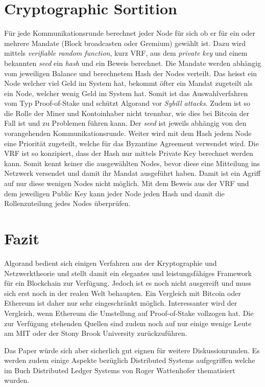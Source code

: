 \documentclass[11pt,a4paper]{article}
\begin{document}
\section*{Cryptographic Sortition}
F\"ur jede Kommunikationsrunde berechnet jeder Node f\"ur sich ob er f\"ur ein oder mehrere Mandate (Block broadcasten oder Gremium) gew\"ahlt ist.
Dazu wird mittels \textit{verifiable random function}, kurz VRF, aus dem \textit{private key} und einem bekannten \textit{seed} ein \textit{hash} und ein Beweis berechnet. %
Die Mandate werden abh\"angig vom jeweiligen Balance und berechnetem Hash der Nodes verteilt.
Das heisst ein Node welcher viel Geld im System hat, bekommt \"ofter ein Mandat zugeteilt als ein Node, welcher wenig Geld im System hat.
Somit ist das Auswahlverfahren vom Typ Proof-of-Stake und sch\"utzt Algorand vor \textit{Sybill attacks}.
Zudem ist so die Rolle der Miner und Kontoinhaber nicht trennbar, wie dies bei Bitcoin der Fall ist und zu Problemen f\"uhren kann.
Der \textit{seed} ist jeweils abh\"angig von den vorangehenden Kommunikationsrunde.
Weiter wird mit dem Hash jedem Node eine Priorit\"at zugeteilt, welche f\"ur das Byzantine Agreement verwendet wird.
Die VRF ist so konzipiert, dass der Hash nur mittels Private Key berechnet werden kann.
Somit kennt keiner die ausgew\"ahlten Nodes, bevor diese eine Mitteilung ins Netzwerk versendet und
damit ihr Mandat ausgef\"uhrt haben.
Damit ist ein Agriff auf nur diese wenigen Nodes nicht m\"oglich.
Mit dem Beweis aus der VRF und dem jeweiligen Public Key kann jeder Node jeden Hash und damit die Rollenzuteilung jedes Nodes \"uberpr\"ufen.

\section*{Fazit}
Algorand bedient sich einigen Verfahren aus der Kryptographie und Netzwerktheorie
und stellt damit ein elegantes und leistungsf\"ahiges Framework für ein Blockchain zur Verf\"ugung.
Jedoch ist es noch nicht ausgereift und muss sich erst noch in der realen Welt behaupten.
Ein Vergleich mit Bitcoin oder Ethereum ist daher nur sehr eingeschr\"ankt m\"oglich.
Interessanter wird der Vergleich, wenn Ethereum die Umstellung auf Proof-of-Stake vollzogen hat.
Die zur Verf\"ugung stehenden Quellen sind zudem noch auf nur einige wenige Leute am MIT oder der Stony Brook University zur\"uckzuf\"uhren. %


Das Paper \cite{Gilad:2017:ASB:3132747.3132757} w\"urde sich aber sicherlich gut eignen f\"ur weitere \grqq{}Diskussionrunden\grqq{}.
Es werden zudem einige Aspekte bez\"uglich Distributed Systems aufgegriffen welche
im Buch \grqq{}Distributed Ledger Systems\grqq{} von Roger Wattenhofer thematisiert wurden.


% 
\newpage
{}

\end{document}
